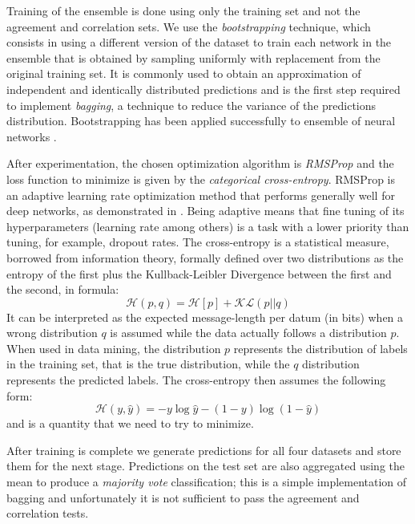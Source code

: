 \documentclass[conference]{IEEEtran}
\begin{document}
Training of the ensemble is done using only the training set and not the
agreement and correlation sets. We use the \textit{bootstrapping} technique,
which consists in using a different version of the dataset to train each network
in the ensemble that is obtained by sampling uniformly with replacement from the
original training set. It is commonly used to obtain an approximation of
independent and identically distributed predictions and is the first step
required to implement \textit{bagging}, a technique to reduce the variance of
the predictions distribution. Bootstrapping has been applied successfully to
ensemble of neural networks \cite{perrone1992networks, west2005neural}.

After experimentation, the chosen optimization algorithm is \textit{RMSProp}
\cite{tieleman2012lecture} and the loss function to minimize is given by the
\textit{categorical cross-entropy}. RMSProp is an adaptive learning rate
optimization method that performs generally well for deep networks, as
demonstrated in \cite{dauphin2015rmsprop, rudergradient, mnih2013playing}. Being
adaptive means that fine tuning of its hyperparameters (learning rate among
others) is a task with a lower priority than tuning, for example, dropout rates.
The cross-entropy is a statistical measure, borrowed from information theory,
formally defined over two distributions as the entropy of the first plus the
Kullback-Leibler Divergence between the first and the second, in formula:
\begin{equation}
	\mathcal{H}(p, q) = \mathcal{H}[p] + \mathcal{KL}(p||q)
	\label{eq:xentropy}
\end{equation}
It can be interpreted as the expected message-length per datum (in bits) when a
wrong distribution $q$ is assumed while the data actually follows a distribution
$p$. When used in data mining, the distribution $p$ represents the distribution
of labels in the training set, that is the true distribution, while the $q$
distribution represents the predicted labels. The cross-entropy then assumes the
following form:
\begin{equation}
	\mathcal{H}(y, \hat{y}) = -y \log \hat{y} - (1 - y) \log (1 - \hat{y})
	\label{eq:xentropy-dm}
\end{equation}
and is a quantity that we need to try to minimize.

After training is complete we generate predictions for all four datasets and
store them for the next stage. Predictions on the test set are also aggregated
using the mean to produce a \textit{majority vote} classification; this is a
simple implementation of bagging and unfortunately it is not sufficient to pass
the agreement and correlation tests.
\end{document}
